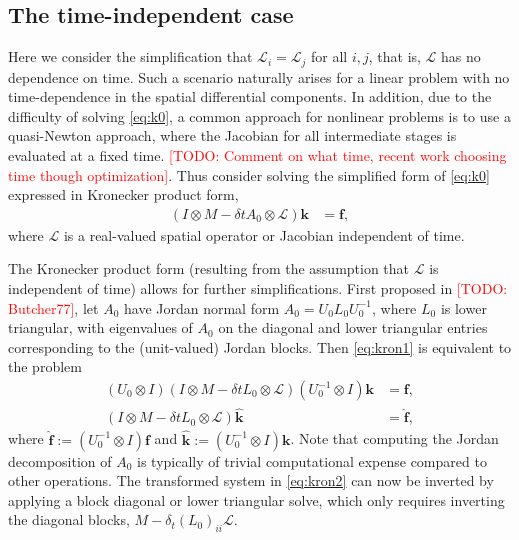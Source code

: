 \documentclass[a4paper,10pt]{article}
\makeatletter
\newcommand{\todo}[1]{\textcolor{red}{[TODO\@: #1]}}
\makeatother
\begin{document}
\subsection{The time-independent case}

Here we consider the simplification that $\mathcal{L}_i = \mathcal{L}_j$ for all $i,j$, that is,
$\mathcal{L}$ has no dependence on time. Such a scenario naturally arises for a linear problem
with no time-dependence in the spatial differential components. In addition, 
due to the difficulty of solving \eqref{eq:k0}, a common approach for nonlinear problems is
to use a quasi-Newton approach, where the Jacobian for all intermediate stages is evaluated
at a fixed time. \todo{Comment on what time, recent work choosing time though optimization}.
Thus consider solving the simplified form of \eqref{eq:k0} expressed in Kronecker product form,
%
\begin{align}\label{eq:kron1}
(I\otimes M - \delta t A_0\otimes \mathcal{L})\mathbf{k} & = \mathbf{f},
\end{align}
%
where $\mathcal{L}$ is a real-valued spatial operator or Jacobian independent of time.

The Kronecker product form (resulting from the assumption that $\mathcal{L}$ is independent of
time) allows for further simplifications. First proposed in \todo{Butcher77}, let $A_0$ have
Jordan normal form $A_0 = U_0L_0U_0^{-1}$, where $L_0$ is lower triangular, with eigenvalues
of $A_0$ on the diagonal and lower triangular entries corresponding to the (unit-valued)
Jordan blocks. Then \eqref{eq:kron1} is equivalent to the problem
%
\begin{align}\label{eq:kron2}
(U_0\otimes I)(I\otimes M - \delta t L_0\otimes \mathcal{L})(U_0^{-1}\otimes I)\mathbf{k} & = \mathbf{f},\\
(I\otimes M - \delta t L_0\otimes \mathcal{L})\hat{\mathbf{k}} & = \hat{\mathbf{f}},
\end{align}
%
where $\hat{\mathbf{f}} := (U_0^{-1}\otimes I)\mathbf{f}$ and
$\hat{\mathbf{k}} := (U_0^{-1}\otimes I)\mathbf{k}$. Note that computing the Jordan
decomposition of $A_0$ is typically of trivial computational expense compared to other
operations. The transformed system in \eqref{eq:kron2} can now be inverted by applying
a block diagonal or lower triangular solve, which only requires inverting the diagonal
blocks, $M - \delta_t(L_0)_{ii}\mathcal{L}$.
\end{document}
